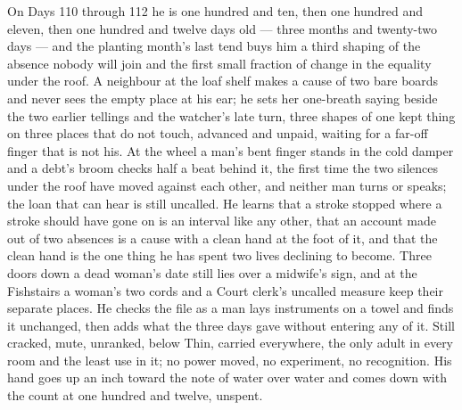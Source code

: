 \documentclass{design/chronicle}
\begin{document}
{On Days 110 through 112 he is one hundred and ten, then one hundred and eleven, then one hundred and twelve days old — three months and twenty-two days — and the planting month’s last tend buys him a third shaping of the absence nobody will join and the first small fraction of change in the equality under the roof. A neighbour at the loaf shelf makes a cause of two bare boards and never sees the empty place at his ear; he sets her one-breath saying beside the two earlier tellings and the watcher’s late turn, three shapes of one kept thing on three places that do not touch, advanced and unpaid, waiting for a far-off finger that is not his. At the wheel a man’s bent finger stands in the cold damper and a debt’s broom checks half a beat behind it, the first time the two silences under the roof have moved against each other, and neither man turns or speaks; the loan that can hear is still uncalled. He learns that a stroke stopped where a stroke should have gone on is an interval like any other, that an account made out of two absences is a cause with a clean hand at the foot of it, and that the clean hand is the one thing he has spent two lives declining to become. Three doors down a dead woman’s date still lies over a midwife’s sign, and at the Fishstairs a woman’s two cords and a Court clerk’s uncalled measure keep their separate places. He checks the file as a man lays instruments on a towel and finds it unchanged, then adds what the three days gave without entering any of it. Still cracked, mute, unranked, below Thin, carried everywhere, the only adult in every room and the least use in it; no power moved, no experiment, no recognition. His hand goes up an inch toward the note of water over water and comes down with the count at one hundred and twelve, unspent.

}
\end{document}

